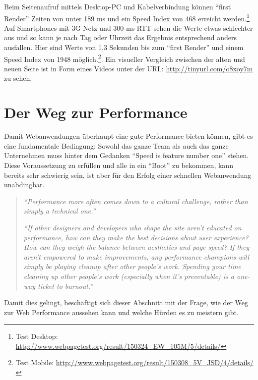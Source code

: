		Beim Seitenaufruf mittels Desktop-PC und Kabelverbindung können "`first Render"' Zeiten von unter 189 ms und ein Speed Index von 468 erreicht werden.\footnote{Test Desktop: \url{http://www.webpagetest.org/result/150324_EW_105M/5/details/}} Auf Smartphones mit 3G Netz und 300 ms RTT sehen die Werte etwas schlechter aus und so kann je nach Tag oder Uhrzeit das Ergebnis entsprechend anders ausfallen. Hier sind Werte von 1,3 Sekunden bis zum "`first Render"' und einem Speed Index von 1948 möglich.\footnote{Test Mobile: \url{http://www.webpagetest.org/result/150308_5V_JSD/4/details/}}. Ein visueller Vergleich zwischen der alten und neuen Seite ist in Form eines Videos unter der URL: \url{http://tinyurl.com/o8xoy7m} zu sehen.
		


\pagebreak

%	
%


\section{Der Weg zur Performance} %
\label{sec:der_weg_zur_performance}
	Damit Webanwendungen überhaupt eine gute Performance  bieten können, gibt es eine fundamentale Bedingung: Sowohl das ganze Team als auch das ganze Unternehmen muss hinter dem Gedanken "`Speed is feature number one"'\autocite{holzle10} stehen. Diese Voraussetzung zu erfüllen und alle in ein "`Boot"' zu bekommen, kann bereits sehr schwierig sein, ist aber für den Erfolg einer schnellen Webanwendung unabdingbar.

	\begin{quote}
		\textit{"`Performance more often comes down to a cultural challenge, rather than simply a technical one."'} \autocite[p. 13]{kovalcin15}

		\textit{"`If other designers and developers who shape the site aren’t educated on performance, how can they make the best decisions about user experience? How can they weigh the balance between aesthetics and page speed? If they aren’t empowered to make improvements, any performance champions will simply be playing cleanup after other people’s work. Spending your time cleaning up other people’s work (especially when it’s preventable) is a one-way ticket to burnout."'} \autocite{hogan14}
	\end{quote}

	Damit dies gelingt, beschäftigt sich dieser Abschnitt mit der Frage, wie der Weg zur Web Performance aussehen kann und welche Hürden es zu meistern gibt.

